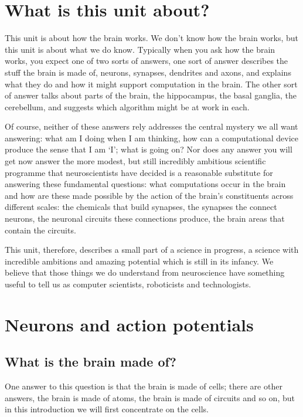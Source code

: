 \documentclass[12pt]{article}
\begin{document}
\section*{What is this unit about?} 
This unit is about how the brain works. We don't know how the brain
works, but this unit is about what we do know. Typically when you ask
how the brain works, you expect one of two sorts of answers, one sort
of answer describes the stuff the brain is made of, neurons, synapses,
dendrites and axons, and explains what they do and how it might
support computation in the brain. The other sort of answer talks about
parts of the brain, the hippocampus, the basal ganglia, the
cerebellum, and suggests which algorithm might be at work in each.

Of course, neither of these answers rely addresses the central mystery
we all want answering: what am I doing when I am thinking, how can a
computational device produce the sense that I am `I'; what is going
on? Nor does any answer you will get now answer the more modest, but
still incredibly ambitious scientific programme that neuroscientists have
decided is a reasonable substitute for answering these fundamental
questions: what computations occur in the brain and how are these made
possible by the action of the brain's constituents across different
scales: the chemicals that build synapses, the synapses the connect
neurons, the neuronal circuits these connections produce, the brain
areas that contain the circuits.

This unit, therefore, describes a small part of a science in progress,
a science with incredible ambitions and amazing potential which is
still in its infancy. We believe that those things we do understand
from neuroscience have something useful to tell us as computer
scientists, roboticists and technologists.

\section*{Neurons and action potentials}

\subsection*{What is the brain made of?}

One answer to this question is that the brain is made of cells; there
are other answers, the brain is made of atoms, the brain is made of
circuits and so on, but in this introduction we will first concentrate
on the cells.
\end{document}

